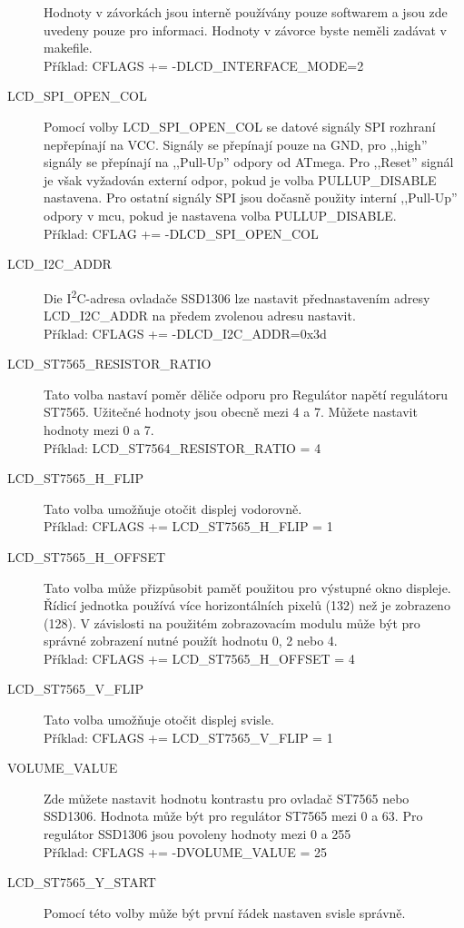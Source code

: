 \begin{description}
Hodnoty v závorkách jsou interně používány pouze softwarem a jsou zde uvedeny pouze pro informaci.
Hodnoty v závorce byste neměli zadávat v makefile.\\
Příklad: CFLAGS += -DLCD\_INTERFACE\_MODE=2
\item[LCD\_SPI\_OPEN\_COL] Pomocí volby LCD\_SPI\_OPEN\_COL se datové signály SPI rozhraní nepřepínají na VCC.
Signály se přepínají pouze na GND, pro ,,high'' signály se přepínají na ,,Pull-Up'' odpory od ATmega.
Pro ,,Reset'' signál je však vyžadován externí odpor, pokud je volba PULLUP\_DISABLE nastavena.
Pro ostatní signály SPI jsou dočasně použity interní ,,Pull-Up'' odpory v mcu,
pokud je nastavena volba PULLUP\_DISABLE.\\
Příklad: CFLAG += -DLCD\_SPI\_OPEN\_COL
\item[LCD\_I2C\_ADDR] Die I\textsuperscript{2}C-adresa ovladače SSD1306 lze nastavit přednastavením adresy
LCD\_I2C\_ADDR na předem zvolenou adresu nastavit.\\
Příklad: CFLAGS += -DLCD\_I2C\_ADDR=0x3d
\item[LCD\_ST7565\_RESISTOR\_RATIO] Tato volba nastaví poměr děliče odporu pro
Regulátor napětí regulátoru ST7565. Užitečné hodnoty jsou obecně mezi 4 a 7.
Můžete nastavit hodnoty mezi 0 a 7. \\
Příklad: LCD\_ST7564\_RESISTOR\_RATIO = 4
\item[LCD\_ST7565\_H\_FLIP] Tato volba umožňuje otočit displej vodorovně.\\
Příklad: CFLAGS += LCD\_ST7565\_H\_FLIP = 1
\item[LCD\_ST7565\_H\_OFFSET] Tato volba může přizpůsobit paměť použitou pro výstupné okno displeje.
Řídicí jednotka používá více horizontálních pixelů (132) než je zobrazeno (128).
V závislosti na použitém zobrazovacím modulu může být pro správné zobrazení nutné použít hodnotu 0, 2 nebo 4.\\
Příklad: CFLAGS += LCD\_ST7565\_H\_OFFSET = 4
\item[LCD\_ST7565\_V\_FLIP] Tato volba umožňuje otočit displej svisle.\\
Příklad: CFLAGS += LCD\_ST7565\_V\_FLIP = 1
\item[VOLUME\_VALUE] Zde můžete nastavit hodnotu kontrastu pro ovladač ST7565 nebo SSD1306.
Hodnota může být pro regulátor ST7565 mezi 0 a 63.
Pro regulátor SSD1306 jsou povoleny hodnoty mezi 0 a 255 \\
Příklad: CFLAGS += -DVOLUME\_VALUE = 25
\item[LCD\_ST7565\_Y\_START] Pomocí této volby může být první řádek nastaven svisle správně.

\end{description}
